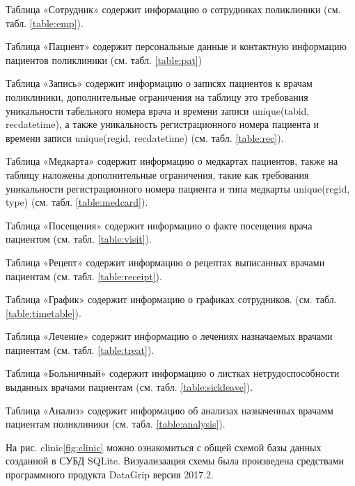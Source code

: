 \documentclass[14pt,a4paper,russian]{extreport}
\begin{document}
\vfill
Таблица «Сотрудник» содержит информацию о сотрудниках поликлиники (см. табл. \ref{table:emp}).\par
Таблица «Пациент» содержит персональные данные и контактную информацию пациентов поликлиники (см. табл.
\ref{table:pat})\par
Таблица «Запись» содержит информацию о записях пациентов к врачам поликлиники,
дополнительные ограничения на таблицу это требования уникальности табельного номера врача и времени
записи unique(tabid, recdatetime), а также уникальность регистрационного номера пациента и времени
записи unique(regid, recdatetime) (см. табл. \ref{table:rec}).\par
Таблица «Медкарта» содержит информацию о медкартах пациентов, также на таблицу наложены дополнительные ограничения, такие как
требования уникальности регистрационного номера пациента и типа медкарты unique(regid, type) (см. табл.
\ref{table:medcard}).\par
Таблица «Посещения» содержит информацию о факте посещения врача пациентом (см. табл.
\ref{table:visit}).\par
Таблица «Рецепт» содержит информацию о рецептах выписанных врачами пациентам (см. табл.
\ref{table:receipt}).\par
Таблица «График» содержит информацию о графиках сотрудников.
(см. табл. \ref{table:timetable}).\par
Таблица «Лечение» содержит информацию о лечениях назначаемых врачами пациентам (см. табл.
\ref{table:treat}).\par
Таблица «Больничный» содержит информацию о листках нетрудоспособности выданных врачами пациентам
(см. табл. \ref{table:sickleave}).\par
Таблица «Анализ» содержит информацию об анализах назначенных врачамм пациентам поликлиники (см.
табл. \ref{table:analysis}).\par


На рис. clinic\ref{fig:clinic} можно ознакомиться с общей схемой базы данных созданной в СУБД SQLite. Визуализаация схемы была
произведена средствами программного продукта DataGrip версия 2017.2.
\end{document}
